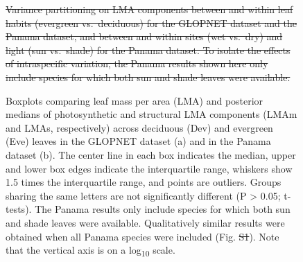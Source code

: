 \documentclass[
  12pt,
  letterpaper,
  DIV=11,
  numbers=noendperiod]{scrartcl}
\providecommand{\DIFadd}[1]{{\protect\color{blue}\uwave{#1}}} %
\providecommand{\DIFdel}[1]{{\protect\color{red}\sout{#1}}}                      %
\providecommand{\DIFaddFL}[1]{\DIFadd{#1}} %
\providecommand{\DIFdelFL}[1]{\DIFdel{#1}} %
\providecommand{\DIFaddbeginFL}{} %
\providecommand{\DIFaddendFL}{} %
\providecommand{\DIFdelbeginFL}{} %
\providecommand{\DIFdelendFL}{} %
\newcommand{\DIFscaledelfig}{0.5}
\newlength{\DIFdelgraphicswidth} %
\newlength{\DIFdelgraphicsheight} %
\newcommand{\DIFaddincludegraphics}[2][]{{\color{blue}\fbox{\DIFOincludegraphics[#1]{#2}}}} %
\newcommand{\DIFdelincludegraphics}[2][]{%
\sbox{\DIFdelgraphicsbox}{\DIFOincludegraphics[#1]{#2}}%
\settoboxwidth{\DIFdelgraphicswidth}{\DIFdelgraphicsbox} %
\settoboxtotalheight{\DIFdelgraphicsheight}{\DIFdelgraphicsbox} %
\scalebox{\DIFscaledelfig}{%
\parbox[b]{\DIFdelgraphicswidth}{\usebox{\DIFdelgraphicsbox}\\[-\baselineskip] \rule{\DIFdelgraphicswidth}{0em}}\llap{\resizebox{\DIFdelgraphicswidth}{\DIFdelgraphicsheight}{%
\setlength{\unitlength}{\DIFdelgraphicswidth}%
\begin{picture}(1,1)%
\thicklines\linethickness{2pt} %
{\color[rgb]{1,0,0}\put(0,0){\framebox(1,1){}}}%
{\color[rgb]{1,0,0}\put(0,0){\line( 1,1){1}}}%
{\color[rgb]{1,0,0}\put(0,1){\line(1,-1){1}}}%
\end{picture}%
}\hspace*{3pt}}} %
} %
\DeclareRobustCommand{\DIFaddbeginFL}{\DIFOaddbeginFL \let\includegraphics\DIFaddincludegraphics} %
\DeclareRobustCommand{\DIFaddendFL}{\DIFOaddendFL \let\includegraphics\DIFOincludegraphics} %
\DeclareRobustCommand{\DIFdelbeginFL}{\DIFOdelbeginFL \let\includegraphics\DIFdelincludegraphics} %
\DeclareRobustCommand{\DIFdelendFL}{\DIFOaddendFL \let\includegraphics\DIFOincludegraphics} %
\begin{document}
\newpage

\begin{figure}

\DIFdelbeginFL %



{%
\DIFdelFL{Variance partitioning on LMA components
between and within leaf habits (evergreen vs.~deciduous) for the GLOPNET
dataset and the Panama dataset, and between and within sites (wet
vs.~dry) and light (sun vs.~shade) for the Panama dataset. To isolate
the effects of intraspecific variation, the Panama results shown here
only include species for which both sun and shade leaves were
available.}}




\DIFdelendFL {}

\caption{\label{fig-box_de}Boxplots comparing leaf mass per area (LMA)
and posterior medians of photosynthetic and structural LMA components
(LMAm and LMAs, respectively) across deciduous (Dev) and evergreen (Eve)
leaves in the GLOPNET dataset (a) and in the Panama dataset (b). The
center line in each box indicates the median, upper and lower box edges
indicate the interquartile range, whiskers show 1.5 times the
interquartile range, and points are outliers. Groups sharing the same
letters are not significantly different (P \textgreater{} 0.05;
t-tests). The Panama results only include species for which both sun and
shade leaves were available. Qualitatively similar results were obtained
when all Panama species were included (Fig. \DIFdelbeginFL \DIFdelFL{S1}\DIFdelendFL \DIFaddbeginFL \DIFaddFL{S2}\DIFaddendFL ). Note that the vertical
axis is on a log\textsubscript{10} scale.}

\end{figure}%

\newpage
\end{document}
